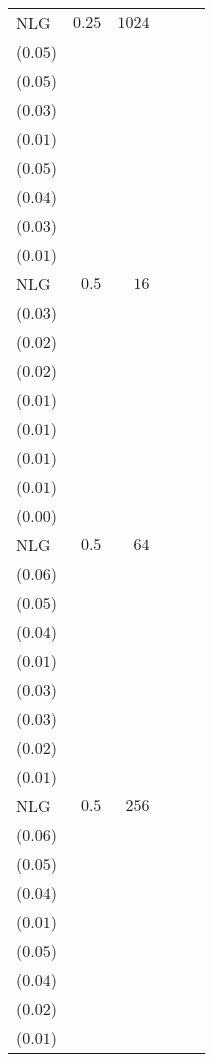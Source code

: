 \begin{table}[t]
\begin{tabular}{lrrrrr}
NLG & \(0.25\) & \(1024\) & \longcell{\(0.53\)\\{\tiny(\(0.05\))}} & \longcell{\(0.47\)\\{\tiny(\(0.05\))}} & \longcell{\(0.35\)\\{\tiny(\(0.03\))}} & \longcell{\(0.14\)\\{\tiny(\(0.01\))}} & \longcell{\(0.30\)\\{\tiny(\(0.05\))}} & \longcell{\(0.25\)\\{\tiny(\(0.04\))}} & \longcell{\(0.17\)\\{\tiny(\(0.03\))}} & \longcell{\(0.06\)\\{\tiny(\(0.01\))}} \\[2.2e\\[2.2ex]
NLG & \(0.5\) & \(16\) & \longcell{\(0.15\)\\{\tiny(\(0.03\))}} & \longcell{\(0.13\)\\{\tiny(\(0.02\))}} & \longcell{\(0.10\)\\{\tiny(\(0.02\))}} & \longcell{\(0.05\)\\{\tiny(\(0.01\))}} & \longcell{\(0.05\)\\{\tiny(\(0.01\))}} & \longcell{\(0.04\)\\{\tiny(\(0.01\))}} & \longcell{\(0.03\)\\{\tiny(\(0.01\))}} & \longcell{\(0.02\)\\{\tiny(\(0.00\))}} \\[2.2e\\[2.2ex]
NLG & \(0.5\) & \(64\) & \longcell{\(0.26\)\\{\tiny(\(0.06\))}} & \longcell{\(0.23\)\\{\tiny(\(0.05\))}} & \longcell{\(0.17\)\\{\tiny(\(0.04\))}} & \longcell{\(0.08\)\\{\tiny(\(0.01\))}} & \longcell{\(0.10\)\\{\tiny(\(0.03\))}} & \longcell{\(0.09\)\\{\tiny(\(0.03\))}} & \longcell{\(0.06\)\\{\tiny(\(0.02\))}} & \longcell{\(0.03\)\\{\tiny(\(0.01\))}} \\[2.2e\\[2.2ex]
NLG & \(0.5\) & \(256\) & \longcell{\(0.39\)\\{\tiny(\(0.06\))}} & \longcell{\(0.35\)\\{\tiny(\(0.05\))}} & \longcell{\(0.27\)\\{\tiny(\(0.04\))}} & \longcell{\(0.12\)\\{\tiny(\(0.01\))}} & \longcell{\(0.19\)\\{\tiny(\(0.05\))}} & \longcell{\(0.16\)\\{\tiny(\(0.04\))}} & \longcell{\(0.11\)\\{\tiny(\(0.02\))}} & \longcell{\(0.05\)\\{\tiny(\(0.01\))}} \\[2.2e\\[2.2ex]

\end{tabular}
\end{table}

